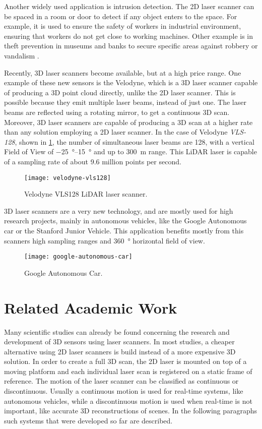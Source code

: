 Another widely used application is intrusion detection. The 2D laser scanner can be spaced in a room or door to detect if any object enters to the space. For example, it is used to ensure the safety of workers in industrial environment, ensuring that workers do not get close to working machines. Other example is in theft prevention in museums and banks to secure specific areas against robbery or vandalism \cite{sick-security}.

Recently, 3D laser scanners become available, but at a high price range. One example of these new sensors is the Velodyne, which is a 3D laser scanner capable of producing a 3D point cloud directly, unlike the 2D laser scanner. This is possible because they emit multiple laser beams, instead of just one. The laser beams are reflected using a rotating mirror, to get a continuous 3D scan. Moreover, 3D laser scanners are capable of producing a 3D scan at a higher rate than any solution employing a 2D laser scanner. In the case of Velodyne \emph{VLS-128}, shown in \cref{fig:velodyne-vls128}, the number of simultaneous laser beams are \num{128}, with a vertical Field of View of \SIrange{-25}{+15}{\degree} and up to \SI{300}{\meter} range\cite{velodyne-vls128}. This LiDAR laser is capable of a sampling rate of about 9.6 million points per second.

\begin{figure}[h]
    \centering
    \texttt{[image: velodyne-vls128]}
    \caption{Velodyne VLS128 LiDAR laser scanner.}
    \label{fig:velodyne-vls128}
\end{figure}

3D laser scanners are a very new technology, and are mostly used for high research projects, mainly in autonomous vehicles, like the Google Autonomous car \cite{google-self-driving} or the Stanford Junior Vehicle\cite{montemerlo08}. This application benefits mostly from this scanners high sampling ranges and \SI{360}{\degree} horizontal field of view.

\begin{figure}[h]
    \centering
    \texttt{[image: google-autonomous-car]}
    \caption{Google Autonomous Car.}
    \label{fig:google-autonomous-car}
\end{figure}

\section{Related Academic Work}

Many scientific studies can already be found concerning the research and development of 3D sensors using laser scanners. In most studies, a cheaper alternative using 2D laser scanners is build instead of a more expensive 3D solution. In order to create a full 3D scan, the 2D laser is mounted on top of a moving platform and each individual laser scan is registered on a static frame of reference. The motion of the laser scanner can be classified as continuous or discontinuous. Usually a continuous motion is used for real-time systems, like autonomous vehicles, while a discontinuous motion is used when real-time is not important, like accurate 3D reconstructions of scenes. In the following paragraphs such systems that were developed so far are described.

